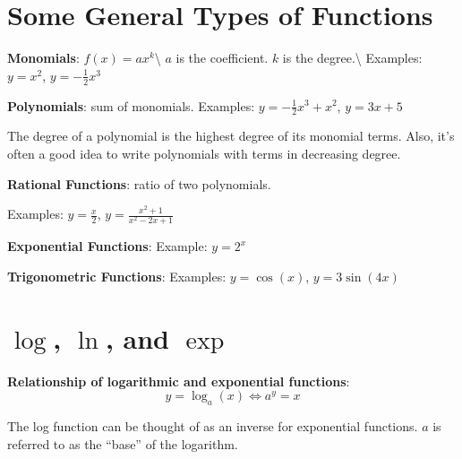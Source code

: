 \documentclass[]{book}
\theoremstyle{definition}
\theoremstyle{definition}
\theoremstyle{definition}
\theoremstyle{remark}
\begin{document}
\section{Some General Types of
Functions}\label{some-general-types-of-functions}

\textbf{Monomials}: \(f(x)=a x^k\)\textbackslash{} \(a\) is the
coefficient. \(k\) is the degree.\textbackslash{} Examples: \(y=x^2\),
\(y=-\frac{1}{2}x^3\)

\textbf{Polynomials}: sum of monomials. Examples:
\(y=-\frac{1}{2}x^3+x^2\), \(y=3x+5\)

The degree of a polynomial is the highest degree of its monomial terms.
Also, it's often a good idea to write polynomials with terms in
decreasing degree.

\textbf{Rational Functions}: ratio of two polynomials.

Examples: \(y=\frac{x}{2}\), \(y=\frac{x^2+1}{x^2-2x+1}\)

\textbf{Exponential Functions}: Example: \(y=2^x\)

\textbf{Trigonometric Functions}: Examples: \(y=\cos(x)\),
\(y=3\sin(4x)\)

\begin{comment}
    \parbox[c]{4.75in}{{\bf Linear}: polynomial of degree 1.\\
        Example: $y=m x + b$, where $m$ is the slope and $b$ is the $y$-intercept.}\epsfxsize=1in \parbox{1in}{\, {\texttt{[image: linear.eps]}}}
    
    \item \parbox[c]{4.75in}{{\bf Nonlinear}: anything that isn't constant or polynomial of degree 1.\\
        Examples:  $y=x^2+2x+1$, $y=\sin(x)$, $y=\ln(x)$, $y=e^x$}
        \parbox{1in}{\,  {\texttt{[image: nonlin.eps]}}}
\end{comment}

\section{\texorpdfstring{\(\log\), \(\ln\), and
\(\exp\)}{\textbackslash{}log, \textbackslash{}ln, and \textbackslash{}exp}}\label{log-ln-and-exp}

\textbf{Relationship of logarithmic and exponential functions}:
\[y=\log_a(x) \iff a^y=x\]

The log function can be thought of as an inverse for exponential
functions. \(a\) is referred to as the ``base'' of the logarithm.
\end{document}
